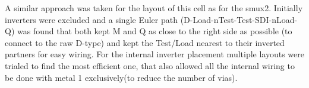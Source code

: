 
A similar approach was taken for the layout of this cell as for the smux2.
Initially inverters were excluded and a single Euler path
(D-Load-nTest-Test-SDI-nLoad-Q) was found that both
kept M and Q as close to the right side as possible (to connect to the raw
D-type) and  kept the Test/Load nearest to their inverted partners for easy wiring.
For the internal inverter placement multiple layouts were trialed to find the
most efficient one, that also allowed all the internal wiring to be done with
metal 1 exclusively(to reduce the number of vias).


